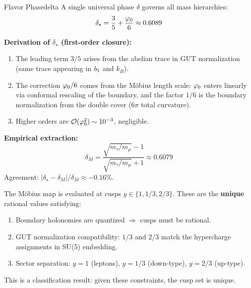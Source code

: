 \begin{definition}{Flavor Phase}{delta}
A single universal phase $\delta$ governs all mass hierarchies:
\begin{equation}
    \delta_\star = \frac{3}{5} + \frac{\varphi_0}{6} \approx 0.6089
\end{equation}

\textbf{Derivation of $\delta_\star$ (first-order closure):}
\begin{enumerate}[leftmargin=1.5em, topsep=2pt, itemsep=1pt]
    \item The leading term $3/5$ arises from the abelian trace in GUT normalization 
        (same trace appearing in $b_1$ and $k_B$).
    \item The correction $\varphi_0/6$ comes from the M\"obius length scale: $\varphi_0$ 
        enters linearly via conformal rescaling of the boundary, and the factor 
        $1/6$ is the boundary normalization from the double cover ($6\pi$ total curvature).
    \item Higher orders are $\mathcal{O}(\varphi_0^2) \sim 10^{-3}$, negligible.
\end{enumerate}

\textbf{Empirical extraction:}
\begin{equation}
    \delta_M = \frac{\sqrt{m_\tau/m_\mu} - 1}{\sqrt{m_\tau/m_\mu} + 1} \approx 0.6079
\end{equation}
Agreement: $|\delta_\star - \delta_M| / \delta_M \approx -0.16\%$.
\end{definition}

\begin{tcolorbox}[colback=gray!5, colframe=gray!50, 
    title={\textbf{Why These Cusps?}}, fonttitle=\bfseries\small]
The M\"obius map is evaluated at cusps $y \in \{1, 1/3, 2/3\}$. These are the 
\textbf{unique} rational values satisfying:
\begin{enumerate}[leftmargin=1.5em, topsep=2pt, itemsep=1pt]
    \item Boundary holonomies are quantized $\Rightarrow$ cusps must be rational.
    \item GUT normalization compatibility: $1/3$ and $2/3$ match the hypercharge 
        assignments in SU(5) embedding.
    \item Sector separation: $y = 1$ (leptons), $y = 1/3$ (down-type), $y = 2/3$ (up-type).
\end{enumerate}
This is a classification result: given these constraints, the cusp set is unique.
\end{tcolorbox}

